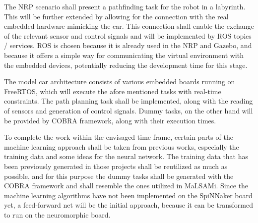 The NRP scenario shall present a pathfinding task for the robot in a labyrinth. This will be further extended by allowing for the connection with the real embedded hardware mimicking the car. This connection shall enable the exchange of the relevant sensor and control signals and will be implemented by ROS topics / services. ROS is chosen because it is already used in the NRP and Gazebo, and because it offers a simple way for communicating the virtual environment with the embedded devices, potentially reducing the development time for this stage.

The model car architecture consists of various embedded boards running on FreeRTOS, which will execute the afore mentioned tasks with real-time constraints. The path planning task shall be implemented, along with the reading of sensors and generation of control signals. Dummy tasks, on the other hand will be provided by COBRA framework, along with their execution times. 

To complete the work within the envisaged time frame, certain parts of the machine learning approach shall be taken from previous works, especially the training data and some ideas for the neural network. The training data that has been previously generated in those projects shall be reutilized as much as possible, and for this purpose the dummy tasks shall be generated with the COBRA framework and shall resemble the ones utilized in MaLSAMi. Since the machine learning algorithms have not been implemented on the SpiNNaker board yet, a feed-forward net will be the initial approach, because it can be transformed to run on the neuromorphic board.

